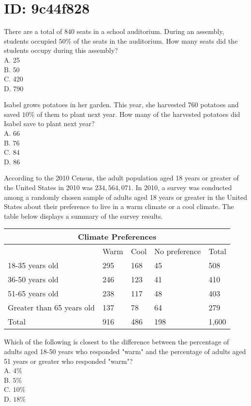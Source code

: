 \section*{ID: 9c44f828}
There are a total of 840 seats in a school auditorium. During an assembly, students occupied $50 \%$ of the seats in the auditorium. How many seats did the students occupy during this assembly?\\
A. 25\\
B. 50\\
C. 420\\
D. 790

Isabel grows potatoes in her garden. This year, she harvested 760 potatoes and saved $10 \%$ of them to plant next year. How many of the harvested potatoes did Isabel save to plant next year?\\
A. 66\\
B. 76\\
C. 84\\
D. 86

According to the 2010 Census, the adult population aged 18 years or greater of the United States in 2010 was $234,564,071$. In 2010, a survey was conducted among a randomly chosen sample of adults aged 18 years or greater in the United States about their preference to live in a warm climate or a cool climate. The table below displays a summary of the survey results.

\begin{center}
\begin{tabular}{|l|l|l|l|l|}
\hline
\multicolumn{5}{|c|}{Climate Preferences} \\
\hline
 & Warm & Cool & No preference & Total \\
\hline
18-35 years old & 295 & 168 & 45 & 508 \\
\hline
36-50 years old & 246 & 123 & 41 & 410 \\
\hline
51-65 years old & 238 & 117 & 48 & 403 \\
\hline
Greater than 65 years old & 137 & 78 & 64 & 279 \\
\hline
Total & 916 & 486 & 198 & 1,600 \\
\hline
\end{tabular}
\end{center}

Which of the following is closest to the difference between the percentage of adults aged 18-50 years who responded "warm" and the percentage of adults aged 51 years or greater who responded "warm"?\\
A. $4 \%$\\
B. $5 \%$\\
C. $10 \%$\\
D. $18 \%$

